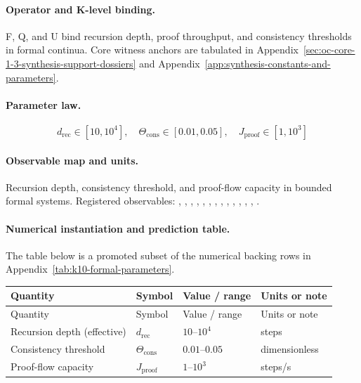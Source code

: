 \paragraph{Operator and K-level binding.}
F, Q, and U bind recursion depth, proof throughput, and consistency thresholds in formal continua.
Core witness anchors are tabulated in Appendix~\ref{sec:oc-core-1-3-synthesis-support-dossiers} and Appendix~\ref{app:synthesis-constants-and-parameters}.

\paragraph{Parameter law.}
\[
d_{\mathrm{rec}} \in [10,10^4],\quad \Theta_{\mathrm{cons}} \in [0.01,0.05],\quad J_{\mathrm{proof}} \in [1,10^3]
\]

\paragraph{Observable map and units.}
Recursion depth, consistency threshold, and proof-flow capacity in bounded formal systems.
Registered observables: , \allowbreak {}, \allowbreak {}, \allowbreak {}, \allowbreak {}, \allowbreak {}, \allowbreak {}, \allowbreak {}, \allowbreak {}, \allowbreak {}, \allowbreak {}, \allowbreak {}, \allowbreak {}, \allowbreak {}.

\paragraph{Numerical instantiation and prediction table.}
The table below is a promoted subset of the numerical backing rows in Appendix~\ref{tab:k10-formal-parameters}.
\begin{longtable}{@{}L{0.27\textwidth}L{0.15\textwidth}L{0.24\textwidth}L{0.16\textwidth}@{}}
\toprule
Quantity & Symbol & Value / range & Units or note \\
\midrule
\endfirsthead
\toprule
Quantity & Symbol & Value / range & Units or note \\
\midrule
\endhead
Recursion depth (effective) & $\scriptstyle d_{\mathrm{rec}}$ & $10\text{--}10^4$ & steps \\
Consistency threshold & $\scriptstyle \Theta_{\mathrm{cons}}$ & $0.01\text{--}0.05$ & dimensionless \\
Proof-flow capacity & $\scriptstyle J_{\mathrm{proof}}$ & $1\text{--}10^3$ & steps/s \\
\bottomrule
\end{longtable}


